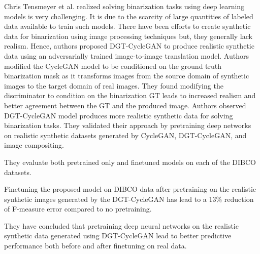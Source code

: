 Chris Tensmeyer et al.\cite{8978087} realized solving binarization tasks using deep learning models is very challenging. It is due to the scarcity of large quantities of labeled data available to train such models. There have been efforts to create synthetic data for binarization using image processing techniques but, they generally lack realism\cite{8978087}. Hence, authors proposed DGT-CycleGAN to produce realistic synthetic data using an adversarially trained image-to-image translation model\cite{8978087}. Authors modified the \ac{CycleGAN} model to be conditioned on the ground truth binarization mask as it transforms images from the source domain of synthetic images to the target domain of real images\cite{8978087}. They found modifying the discriminator to condition on the binarization \ac{GT} leads to increased realism and better agreement between the \ac{GT} and the produced image. Authors observed DGT-CycleGAN model produces more realistic synthetic data for solving binarization tasks\cite{8978087}. They validated their approach by pretraining deep networks on realistic synthetic datasets generated by \ac{CycleGAN}, DGT-CycleGAN, and image compositing\cite{8978087}. 


They evaluate both pretrained only and finetuned models on each of the \ac{DIBCO} datasets. 

Finetuning the proposed model on \ac{DIBCO} data after pretraining on the realistic synthetic images generated by the DGT-CycleGAN has lead to a 13\% reduction of F-measure error compared to no pretraining.

They have concluded that pretraining deep neural networks on the realistic synthetic data generated using DGT-CycleGAN lead to better predictive performance both before and after finetuning on real data.



